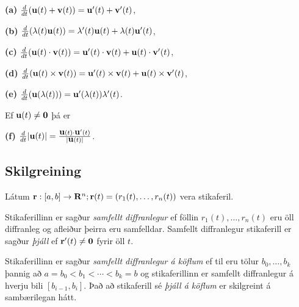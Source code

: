 \documentclass[a4paper,10pt,icelandic]{sphinxmanual}
\begin{document}
\textbf{(a)}
\(\frac{d}{dt}(\mbox{${\bf u}$}(t)+\mbox{${\bf v}$}(t))=\mbox{${\bf u}$}'(t)+\mbox{${\bf v}$}'(t)\),

\textbf{(b)}
\(\frac{d}{dt}(\lambda(t)\mbox{${\bf u}$}(t))=\lambda'(t)\mbox{${\bf u}$}(t)+\lambda(t)\mbox{${\bf u}$}'(t)\),

\textbf{(c)}
\(\frac{d}{dt}(\mbox{${\bf u}$}(t)\cdot\mbox{${\bf v}$}(t))=\mbox{${\bf u}$}'(t)\cdot\mbox{${\bf v}$}(t)+\mbox{${\bf u}$}(t)\cdot\mbox{${\bf v}$}'(t)\),

\textbf{(d)}
\(\frac{d}{dt}(\mbox{${\bf u}$}(t)\times\mbox{${\bf v}$}(t))=\mbox{${\bf u}$}'(t)\times\mbox{${\bf v}$}(t)+\mbox{${\bf u}$}(t)\times\mbox{${\bf v}$}'(t)\),

\textbf{(e)}
\(\frac{d}{dt}(\mbox{${\bf u}$}(\lambda(t)))=\mbox{${\bf u}$}'(\lambda(t))\lambda'(t)\).

Ef \(\mbox{${\bf u}$}(t)\neq\mbox{${\bf 0}$}\) þá er

\textbf{(f)}
\(\frac{d}{dt}|\mbox{${\bf u}$}(t)|=\frac{\mbox{${\bf u}$}(t)\cdot\mbox{${\bf u}$}'(t)}{|\mbox{${\bf u}$}(t)|}\).


\subsection{Skilgreining}
\label{Kafli1:index-4}\label{Kafli1:id6}
Látum
\(\mbox{${\bf r}$}:  [a,b]\rightarrow \mbox{${\bf R}^n$}; \mbox{${\bf r}$}(t)=(r_1(t),\ldots,r_n(t))\)
vera stikaferil.

Stikaferillinn er sagður \textit{samfellt diffranlegur} ef föllin
\(r_1(t),\ldots,r_n(t)\) eru öll diffranleg og afleiður þeirra eru
samfelldar. Samfellt diffranlegur stikaferill er sagður \textit{þjáll}
ef \(\mbox{${\bf r}$}'(t)\neq\mbox{${\bf 0}$}\) fyrir
öll \(t\).

Stikaferillinn er sagður \emph{samfellt diffranlegur á köflum} ef til eru
tölur \(b_0,\ldots,b_k\) þannig að \(a=b_0<b_1<\cdots<b_k=b\) og
stikaferillinn er samfellt diffranlegur á hverju bili
\([b_{i-1}, b_i]\). Það að stikaferill sé \textit{þjáll á köflum} er skilgreint á sambærilegan hátt.

\end{document}
